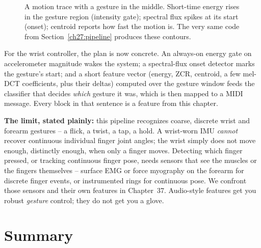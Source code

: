 \begin{figure}[H]
\centering
{}
\caption{A motion trace with a gesture in the middle. Short-time energy rises in
the gesture region (intensity gate); spectral flux spikes at its start (onset);
centroid reports how fast the motion is. The very same code from
Section~\ref{ch27:pipeline} produces these contours.}
\label{ch27:fig-motion}
\end{figure}

\begin{goalbox}
For the wrist controller, the plan is now concrete. An always-on energy gate on
accelerometer magnitude wakes the system; a spectral-flux onset detector marks the
gesture's start; and a short feature vector (energy, ZCR, centroid, a few
mel-DCT coefficients, plus their deltas) computed over the gesture window feeds the
classifier that decides \emph{which} gesture it was, which is then mapped to a MIDI
message. Every block in that sentence is a feature from this chapter.

\textbf{The limit, stated plainly:} this pipeline recognizes coarse,
discrete wrist and forearm gestures -- a flick, a twist, a tap, a hold. A
wrist-worn IMU \emph{cannot} recover continuous individual finger joint angles;
the wrist simply does not move enough, distinctly enough, when only a finger
moves. Detecting which finger pressed, or tracking continuous finger pose, needs
sensors that see the muscles or the fingers themselves -- surface EMG or force
myography on the forearm for discrete finger events, or instrumented rings for
continuous pose. We confront those sensors and their own features in
Chapter~37. Audio-style features get you robust \emph{gesture} control; they do
not get you a glove.
\end{goalbox}

\section{Summary}
\label{ch27:summary}

